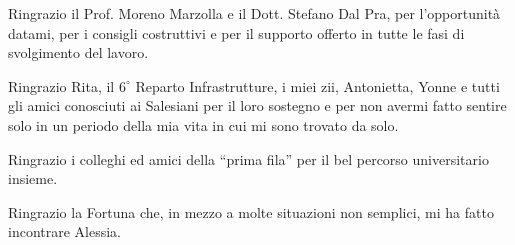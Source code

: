 Ringrazio il Prof. Moreno Marzolla e il Dott. Stefano Dal Pra, per
l'opportunità datami, per i consigli costruttivi e per il supporto offerto in
tutte le fasi di svolgimento del lavoro.

\mbox{}

Ringrazio Rita, il $6^\circ$ Reparto Infrastrutture, i miei zii, Antonietta,
Yonne e tutti gli amici conosciuti ai Salesiani per il loro sostegno e per non
avermi fatto sentire solo in un periodo della mia vita in cui mi sono trovato
da solo.

\mbox{}

Ringrazio i colleghi ed amici della ``prima fila'' per il bel percorso
universitario insieme.

\mbox{}

Ringrazio la Fortuna che, in mezzo a molte situazioni non semplici, mi ha
fatto incontrare Alessia.
